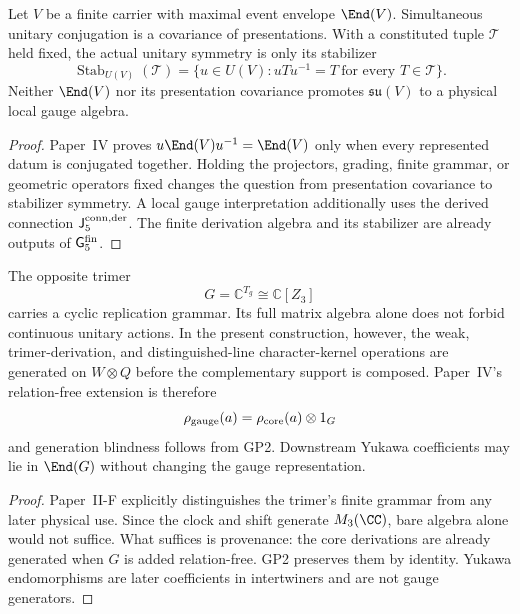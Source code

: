 \documentclass[12pt,a4paper]{article}
\begin{document}
\begin{lemma}
\label{p5:lem:unresolved-support-full-unitary-closure}
Let \(V\) be a finite carrier with maximal event envelope \(\End(V)\).
Simultaneous unitary conjugation is a covariance of presentations.  With a
constituted tuple \(\mathcal T\) held fixed, the actual unitary symmetry is only
its stabilizer
\[
\operatorname{Stab}_{U(V)}(\mathcal T)
=\{u\in U(V):uTu^{-1}=T\ \text{for every }T\in\mathcal T\}.
\]
Neither \(\End(V)\) nor its presentation covariance promotes
\(\mathfrak{su}(V)\) to a physical local gauge algebra.
\end{lemma}

\begin{proof}
Paper~IV proves
\(u\End(V)u^{-1}=\End(V)\) only when every represented datum is conjugated
together.  Holding the projectors, grading, finite grammar, or geometric
operators fixed changes the question from presentation covariance to
stabilizer symmetry.  A local gauge interpretation additionally uses the
derived connection \(\mathsf J_5^{\rm conn,der}\).  The finite
derivation algebra and its stabilizer are already outputs of
\(\mathsf G_5^{\rm fin}\).
\end{proof}

\begin{lemma}
\label{p5:lem:replication-not-gauge-support}
The opposite trimer
\[
G=\mathbb C^{T_g}\cong\mathbb C[Z_3]
\]
carries a cyclic replication grammar.  Its full matrix algebra alone does not
forbid continuous unitary actions.  In the present construction, however, the
weak, trimer-derivation, and distinguished-line character-kernel operations are generated
on \(W\otimes Q\) before the complementary support is composed.  Paper~IV's
relation-free extension is therefore
\[
\rho_{\rm gauge}(a)=\rho_{\rm core}(a)\otimes1_G
\]
and generation blindness follows from GP2.  Downstream Yukawa coefficients
may lie in \(\End(G)\) without changing the gauge representation.
\end{lemma}

\begin{proof}
Paper~II-F explicitly distinguishes the trimer's finite grammar from any
later physical use.  Since the clock and shift generate \(M_3(\CC)\), bare
algebra alone would not suffice.  What suffices is provenance: the core
derivations are already generated when \(G\) is added relation-free.  GP2
preserves them by identity.  Yukawa endomorphisms are later coefficients in
intertwiners and are not gauge generators.
\end{proof}
\end{document}
